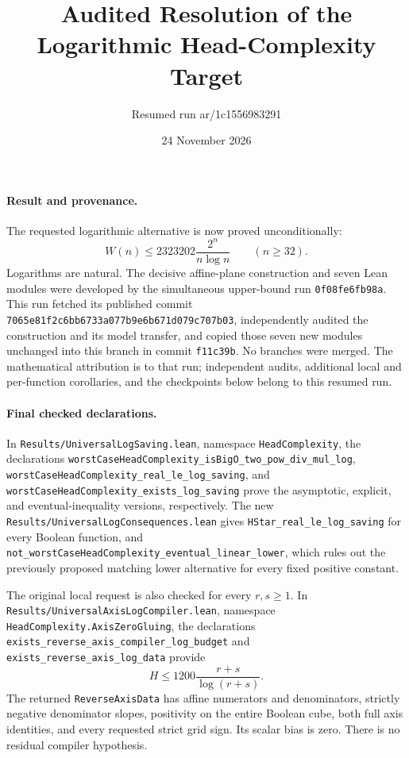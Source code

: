 \documentclass[11pt]{article}
\begin{document}
\title{Audited Resolution of the Logarithmic Head-Complexity Target}
\author{Resumed run ar/1c1556983291}
\date{24 November 2026}
\maketitle

\paragraph{Result and provenance.}
The requested logarithmic alternative is now proved unconditionally:
\[
 W(n)\leq2323202\frac{2^n}{n\log n}\qquad(n\geq32).
\]
Logarithms are natural. The decisive affine-plane construction and seven
Lean modules were developed by the simultaneous upper-bound run
\texttt{0f08fe6fb98a}. This run fetched its published commit
\texttt{7065e81f2c6bb6733a077b9e6b671d079c707b03}, independently audited the
construction and its model transfer, and copied those seven new modules
unchanged into this branch in commit \texttt{f11c39b}. No branches were
merged. The mathematical attribution is to that run; independent audits,
additional local and per-function corollaries, and the checkpoints below
belong to this resumed run.

\paragraph{Final checked declarations.}
In \texttt{Results/UniversalLogSaving.lean}, namespace
\texttt{HeadComplexity}, the declarations
\texttt{worstCaseHeadComplexity\_isBigO\_two\_pow\_div\_mul\_log},
\texttt{worstCaseHeadComplexity\_real\_le\_log\_saving}, and
\texttt{worstCaseHeadComplexity\_exists\_log\_saving} prove the asymptotic,
explicit, and eventual-inequality versions, respectively.
The new \texttt{Results/UniversalLogConsequences.lean} gives
\texttt{HStar\_real\_le\_log\_saving} for every Boolean function, and
\texttt{not\_worstCaseHeadComplexity\_eventual\_linear\_lower}, which
rules out the previously proposed matching lower alternative for every
fixed positive constant.

The original local request is also checked for every $r,s\geq1$.
In \texttt{Results/UniversalAxisLogCompiler.lean}, namespace
\texttt{HeadComplexity.AxisZeroGluing}, the declarations
\texttt{exists\_reverse\_axis\_compiler\_log\_budget} and
\texttt{exists\_reverse\_axis\_log\_data} provide
\[
 H\leq1200\frac{r+s}{\log(r+s)}.
\]
The returned \texttt{ReverseAxisData} has affine numerators and denominators,
strictly negative denominator slopes, positivity on the entire Boolean
cube, both full axis identities, and every requested strict grid sign.
Its scalar bias is zero. There is no residual compiler hypothesis.
\end{document}
